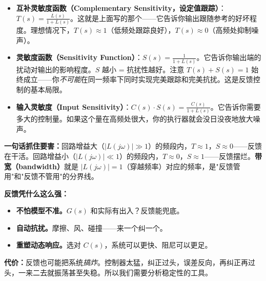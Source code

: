 \begin{itemize}
    \item \textbf{互补灵敏度函数（Complementary Sensitivity，设定值跟踪）}：$T(s) = \frac{L(s)}{1 + L(s)}$。这就是上面写的那个——它告诉你输出跟随参考的好坏程度。理想情况下，$T(s) \approx 1$（低频处跟踪良好），$T(s) \approx 0$（高频处抑制噪声）。

    \item \textbf{灵敏度函数（Sensitivity Function）}：$S(s) = \frac{1}{1 + L(s)}$。它告诉你输出端的扰动对输出的影响程度。$S$ 越小 = 抗扰性越好。注意 $T(s) + S(s) = 1$ 始终成立——你\textit{不可能}在同一频率下同时实现完美跟踪和完美抗扰。这是反馈控制的基本局限。

    \item \textbf{输入灵敏度（Input Sensitivity）}：$C(s) \cdot S(s) = \frac{C(s)}{1 + L(s)}$。它告诉你需要多大的控制量。如果这个量在高频处很大，你的执行器就会没日没夜地放大噪声。
\end{itemize}

\textbf{一句话抓住要害：}回路增益大（$|L(j\omega)| \gg 1$）的频段内，$T \approx 1$，$S \approx 0$——反馈在干活。回路增益小（$|L(j\omega)| \ll 1$）的频段内，$T \approx 0$，$S \approx 1$——反馈摆烂。\textbf{带宽（bandwidth）}就是 $|L(j\omega)| = 1$（穿越频率）对应的频率，是"反馈管用"和"反馈不管用"的分界线。

\textbf{反馈凭什么这么强：}
\begin{itemize}
    \item \textbf{不怕模型不准。}$G(s)$ 和实际有出入？反馈能兜底。
    \item \textbf{自动抗扰。}摩擦、风、碰撞——来一个纠一个。
    \item \textbf{重塑动态响应。}选对 $C(s)$，系统可以更快、阻尼可以更足。
\end{itemize}

\textbf{代价：}反馈也可能把系统\textit{搞炸}。控制器太猛，纠正过头，误差反向，再纠正再过头，一来二去就振荡甚至失稳。所以我们需要分析稳定性的工具。

